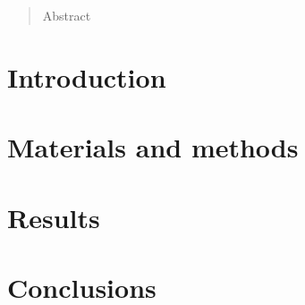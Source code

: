 \documentclass[11pt]{article}
\begin{document}
\maketitle

%
%
\begin{abstract}
    Abstract
\end{abstract}


%
%
\section{Introduction}


%
%
\section{Materials and methods}\label{materials and methods}


%
%
\section{Results}\label{results}


%
%
\section{Conclusions}\label{conclusions}



\end{document}
